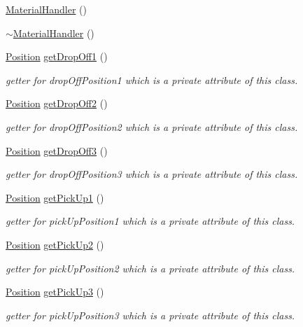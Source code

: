 \begin{DoxyCompactItemize}
\item 
\hyperlink{classMaterialHandler_a1cb01a4bd9cad981ae5d3fdb7feda4e9}{Material\+Handler} ()
\item 
\hyperlink{classMaterialHandler_ad20121774c2dd6ef83a4749b8f012880}{$\sim$\+Material\+Handler} ()
\item 
\hyperlink{structPosition}{Position} \hyperlink{classMaterialHandler_aee5b970fe4ad65e965c8ca4bb406592f}{get\+Drop\+Off1} ()
\begin{DoxyCompactList}\small\item\em getter for drop\+Off\+Position1 which is a private attribute of this class. \end{DoxyCompactList}\item 
\hyperlink{structPosition}{Position} \hyperlink{classMaterialHandler_ad3d95f4e547213a07c79a87adcd02b70}{get\+Drop\+Off2} ()
\begin{DoxyCompactList}\small\item\em getter for drop\+Off\+Position2 which is a private attribute of this class. \end{DoxyCompactList}\item 
\hyperlink{structPosition}{Position} \hyperlink{classMaterialHandler_ad466acfc6d451eda3abfdb9380e5b9a8}{get\+Drop\+Off3} ()
\begin{DoxyCompactList}\small\item\em getter for drop\+Off\+Position3 which is a private attribute of this class. \end{DoxyCompactList}\item 
\hyperlink{structPosition}{Position} \hyperlink{classMaterialHandler_aa11e5fab9fc80e42f2f85ea8f016d7d3}{get\+Pick\+Up1} ()
\begin{DoxyCompactList}\small\item\em getter for pick\+Up\+Position1 which is a private attribute of this class. \end{DoxyCompactList}\item 
\hyperlink{structPosition}{Position} \hyperlink{classMaterialHandler_ab95a6ca4be40bd96fd23776398ff648e}{get\+Pick\+Up2} ()
\begin{DoxyCompactList}\small\item\em getter for pick\+Up\+Position2 which is a private attribute of this class. \end{DoxyCompactList}\item 
\hyperlink{structPosition}{Position} \hyperlink{classMaterialHandler_a4a88c1ea78485f756a909505ca003261}{get\+Pick\+Up3} ()
\begin{DoxyCompactList}\small\item\em getter for pick\+Up\+Position3 which is a private attribute of this class. \end{DoxyCompactList}\end{DoxyCompactItemize}


